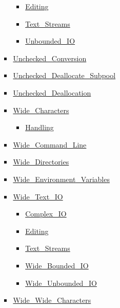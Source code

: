 \documentclass[english]{article}
\begin{document}
\begin{scriptsize}
\begin{multicols*}{5}
\begin{itemize}[leftmargin=0mm]
\begin{itemize}[leftmargin=5mm]
\begin{itemize}[leftmargin=5mm]
\begin{itemize}[leftmargin=5mm]
	  \item[] \href{http://www.ada-auth.org/standards/22rm/html/RM-F-3-3.html}{Editing}
	  \item[] \href{http://www.ada-auth.org/standards/22rm/html/RM-A-12-2.html}{Text\_Streams}
	  \item[] \href{http://www.ada-auth.org/standards/22rm/html/RM-A-10-12.html}{Unbounded\_IO}
	  \end{itemize}
	\item[] \href{http://www.ada-auth.org/standards/22rm/html/RM-13-9.html}{Unchecked\_Conversion}
	\item[] \href{http://www.ada-auth.org/standards/22rm/html/RM-13-11-5.html}{Unchecked\_Deallocate\_Subpool}
	\item[] \href{http://www.ada-auth.org/standards/22rm/html/RM-13-11-2.html}{Unchecked\_Deallocation}
	\item[] \href{http://www.ada-auth.org/standards/22rm/html/RM-A-3-1.html}{Wide\_Characters}
	  \begin{itemize}[leftmargin=5mm]
	  \item[] \href{http://www.ada-auth.org/standards/22rm/html/RM-A-3-5.html}{Handling}
	  \end{itemize}
	\item[] \href{http://www.ada-auth.org/standards/22rm/html/RM-A-15-1.html}{Wide\_Command\_Line}
	\item[] \href{http://www.ada-auth.org/standards/22rm/html/RM-A-16-2.html}{Wide\_Directories}
	\item[] \href{http://www.ada-auth.org/standards/22rm/html/RM-A-17-1.html}{Wide\_Environment\_Variables}
	\item[] \href{http://www.ada-auth.org/standards/22rm/html/RM-A-11.html}{Wide\_Text\_IO}
	  \begin{itemize}[leftmargin=5mm]
	  \item[] \href{http://www.ada-auth.org/standards/22rm/html/RM-G-1-4.html}{Complex\_IO}
	  \item[] \href{http://www.ada-auth.org/standards/22rm/html/RM-F-3-4.html}{Editing}
	  \item[] \href{http://www.ada-auth.org/standards/22rm/html/RM-A-12-3.html}{Text\_Streams}
	  \item[] \href{http://www.ada-auth.org/standards/22rm/html/RM-A-11.html}{Wide\_Bounded\_IO}
	  \item[] \href{http://www.ada-auth.org/standards/22rm/html/RM-A-11.html}{Wide\_Unbounded\_IO}
	  \end{itemize}
	\item[] \href{http://www.ada-auth.org/standards/22rm/html/RM-A-3-1.html}{Wide\_Wide\_Characters}

\end{itemize}
\end{itemize}
\end{itemize}
\end{multicols*}
\end{scriptsize}
\end{document}
